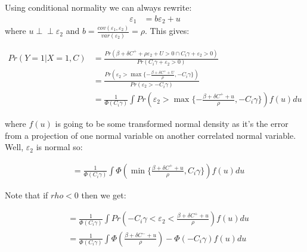\documentclass{article}
\newcommand{\indep}{\perp \!\!\! \perp}
\begin{document}
Using conditional normality we can always rewrite:
\begin{align*}
    \varepsilon_1 &= b\varepsilon_2 + u
\end{align*}
where $u \indep \varepsilon_2$ and $b = \frac{cov(\varepsilon_1, \varepsilon_2)}{var(\varepsilon_2)} = \rho$. 
This gives:

\begin{align*}
    Pr(Y = 1 | X = 1, C) &= \frac{Pr(\beta + \delta C^+ + \rho \varepsilon_2 + U > 0 \cap C_i \gamma + \varepsilon_2  > 0)}{
    Pr(C_i \gamma + \varepsilon_2 > 0)} \\
    &= \frac{Pr(\varepsilon_2 > \max \{ - \frac{\beta + \delta C^+ + U}{\rho}, -C_i \gamma\})}{
        Pr(\varepsilon_2 > -C_i \gamma)
    } \\
    &= \frac{1}{\Phi(C_i \gamma)} \int
    Pr(\varepsilon_2 > \max \{ - \frac{\beta + \delta C^+ + u}{\rho}, -C_i \gamma\}) f(u) du
\end{align*}


where $f(u)$ is going to be some transformed normal density as it's the error from a projection 
of one normal variable on another correlated normal variable. Well, $\varepsilon_2$ is 
normal so:

\begin{align*}
    &= \frac{1}{\Phi(C_i \gamma)} \int
    \Phi\left( \min \{  \frac{\beta + \delta C^+ + u}{\rho}, C_i \gamma\}\right) f(u) du
\end{align*}


Note that if $rho < 0$ then we get:

\begin{align*}
    &= \frac{1}{\Phi(C_i \gamma)} \int
    Pr(-C_i \gamma < \varepsilon_2 <  \frac{\beta + \delta C^+ + u}{\rho}) f(u) du \\
    &= \frac{1}{\Phi(C_i \gamma)} \int
    \Phi(\frac{\beta + \delta C^- + u}{\rho}) - \Phi(-C_i \gamma) f(u) du 
\end{align*}
\end{document}
